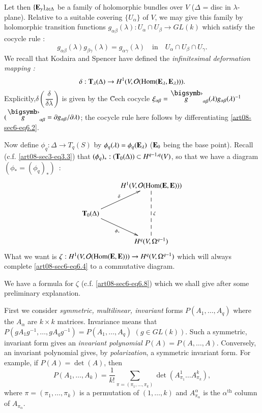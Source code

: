 Let then $\{\mathbf{E}_{\gamma}\}_{\lambda\in\Delta}$ be a family of holomorphic bundles over $V$ ($\Delta$ = disc in $\lambda$-plane). Relative to a suitable covering $\{U_{\alpha}\}$ of $V$, we may give this family by holomorphic transition functions $g_{\alpha\beta}(\lambda):U_{\alpha}\cap U_{\beta}\to GL(k)$ which satisfy the cocycle rule :
\begin{equation}
g_{\alpha\beta}(\lambda)g_{\beta\gamma}(\lambda)=g_{\alpha\gamma}(\lambda)\text{~~ in~~ } U_{\alpha}\cap U_{\beta}\cap U_{\gamma}.\label{art08-sec6-eq6.2}
\end{equation}
We recall that Kodaira and Spencer \cite{art08-key15} have defined the {\em infinitesimal deformation mapping :}
\begin{equation}
\delta : \mathbf{T}_{\lambda}(\Delta)\to H^{1}(V,\mathcal{O}(\operatorname{\mathrm{Hom}}(\mathbf{E}_{\lambda},\mathbf{E}_{\lambda}))).\label{art08-sec6-eq6.3}
\end{equation}
Explicitly,\pageoriginale $\delta\left(\dfrac{\delta}{\delta\lambda}\right)$ is given by the \~Cech cocycle $\xi_{\alpha\beta}=\overdot{g}_{\alpha\beta}(\lambda)g_{\alpha\beta}(\lambda)^{-1}$ $(\overdot{g}_{\alpha\beta}=\partial g_{\alpha\beta}/\partial\lambda)$; the cocycle rule here follows by differentiating \eqref{art08-sec6-eq6.2}. 

Now define $\phi_{q}:\Delta\to T_{q}(S)$ by $\phi_{q}(\lambda)=\phi_{q}(\mathbf{E}_{\lambda})$ ($\mathbf{E}_{0}$ being the base point). Recall (c.f. \eqref{art08-sec3-eq3.3}) that $(\phi_{q})_{*}:(\mathbf{T}_{0}(\Delta))\subset H^{q-1,q}(V)$, so that we have a diagram $(\phi_{*}=(\phi_{q})_{*})$~:
\begin{equation}
\vcenter{\xymatrix{
 & H^{1}(V,\mathcal{O}(\Hom(\bfE,\bfE)))\ar@{--}[dd]^{\zeta}\\
\bfT_{0}(\Delta)\ar[ur]^-{\delta}\ar[dr]_-{\phi_{*}} & \\
 & H^{q}(V,\Omega^{q-1})
}}\label{art08-sec6-eq6.4}
\end{equation}
What we want is $\zeta:H^{1}(V,\mathcal{O}(\operatorname{\mathrm{Hom}}(\mathbf{E},\mathbf{E})))\to H^{q}(V,\Omega^{q-1})$ which will always complete \eqref{art08-sec6-eq6.4} to a commutative diagram.

We have a formula for $\zeta$ (c.f. \eqref{art08-sec6-eq6.8}) which we shall give after some preliminary explanation.

First we consider {\em symmetric, multilinear, invariant} forms $P(A_{1},\ldots,A_{q})$ where the $A_{\alpha}$ are $k\times k$ matrices. Invariance means that $P(gA_{1}g^{-1},\ldots,gA_{q}g^{-1})=P(A_{1},\ldots,A_{q})$ $(g\in GL(k))$. Such a symmetric, invariant form gives an {\em invariant polynomial} $P(A)=P(A,\ldots,A)$. Conversely, an invariant polynomial gives, by {\em polarization}, a symmetric invariant form. For example, if $P(A)=\det(A)$, then
\begin{equation}
P(A_{1},\ldots,A_{k})=\dfrac{1}{k!}\sum\limits_{\pi=(\pi_{1},\ldots,\pi_{k})}\det (A^{1}_{\pi_{1}}\ldots A^{k}_{\pi_{k}}),\label{art08-sec6-eq6.5}
\end{equation}
where $\pi=(\pi_{1},\ldots,\pi_{k})$ is a permutation of $(1,\ldots,k)$ and $A^{\alpha}_{\pi_{\alpha}}$ is the $\alpha^{\text{th}}$ column of $A_{\pi_{\alpha}}$.

